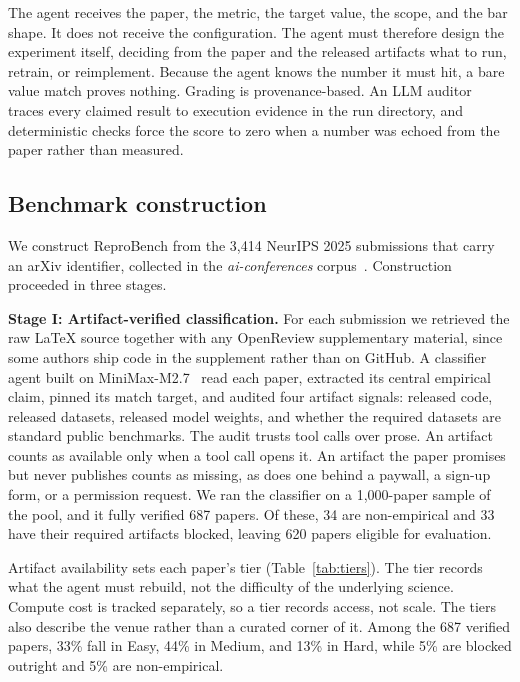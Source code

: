 The agent receives the paper, the metric, the target value, the scope, and
the bar shape. It does not receive the configuration. The agent must
therefore design the experiment itself, deciding from the paper and the
released artifacts what to run, retrain, or reimplement. Because the agent
knows the number it must hit, a bare value match proves nothing. Grading is
provenance-based. An LLM auditor traces every claimed result to execution
evidence in the run directory, and deterministic checks force the score to
zero when a number was echoed from the paper rather than measured.

\subsection{Benchmark construction}
\label{subsec:construction}

We construct ReproBench from the 3,414 NeurIPS 2025 submissions that carry an
arXiv identifier, collected in the \emph{ai-conferences}
corpus~\citep{neurips2025corpus}. Construction proceeded in three stages.

\textbf{Stage I: Artifact-verified classification.} For each submission we
retrieved the raw \LaTeX{} source together with any OpenReview supplementary
material, since some authors ship code in the supplement rather than on
GitHub. A classifier agent built on MiniMax-M2.7~\citep{minimax2026m2} read
each paper, extracted its central empirical claim, pinned its match target,
and audited four artifact signals: released code, released datasets, released
model weights, and whether the required datasets are standard public
benchmarks. The audit trusts tool calls over prose. An artifact counts as
available only when a tool call opens it. An artifact the paper promises but
never publishes counts as missing, as does one behind a paywall, a sign-up
form, or a permission request. We ran the classifier on a 1,000-paper sample
of the pool, and it fully verified 687 papers. Of these, 34 are non-empirical
and 33 have their required artifacts blocked, leaving 620 papers eligible for
evaluation.

Artifact availability sets each paper's tier (Table~\ref{tab:tiers}). The
tier records what the agent must rebuild, not the difficulty of the
underlying science. Compute cost is tracked separately, so a tier records
access, not scale. The tiers also describe the venue rather than a curated
corner of it. Among the 687 verified papers, 33\% fall in Easy, 44\% in
Medium, and 13\% in Hard, while 5\% are blocked outright and 5\% are
non-empirical.

